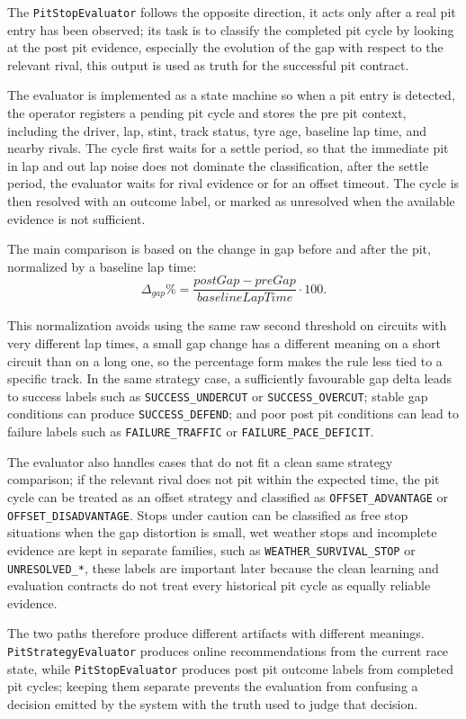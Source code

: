 The \texttt{PitStopEvaluator} follows the opposite direction, it acts only after a real pit entry has been observed; its task is to classify the completed pit cycle by looking
at the post pit evidence, especially the evolution of the gap with respect to the relevant rival, this output is used as truth for the successful pit contract.

The evaluator is implemented as a state machine so when a pit entry is detected, the operator registers a pending pit cycle and stores the pre pit context, including the driver,
lap, stint, track status, tyre age, baseline lap time, and nearby rivals. The cycle first waits for a settle period, so that the immediate pit in lap and out lap noise does not
dominate the classification, after the settle period, the evaluator waits for rival evidence or for an offset timeout. The cycle is then resolved with an outcome label, or marked
as unresolved when the available evidence is not sufficient.

The main comparison is based on the change in gap before and after the pit, normalized by a baseline lap time:
\[
    \Delta_{gap}\% =
    \frac{postGap - preGap}{baselineLapTime} \cdot 100.
\]

This normalization avoids using the same raw second threshold on circuits with very different lap times, a small gap change has a different meaning on a short circuit than on a
long one, so the percentage form makes the rule less tied to a specific track. In the same strategy case, a sufficiently favourable gap delta leads to success labels such as
\texttt{SUCCESS\_UNDERCUT} or \texttt{SUCCESS\_OVERCUT}; stable gap conditions can produce \texttt{SUCCESS\_DEFEND}; and poor post pit conditions can lead to failure labels such as
\texttt{FAILURE\_TRAFFIC} or \texttt{FAILURE\_PACE\_DEFICIT}.

The evaluator also handles cases that do not fit a clean same strategy comparison; if the relevant rival does not pit within the expected time, the pit cycle can be treated as
an offset strategy and classified as \texttt{OFFSET\_ADVANTAGE} or \texttt{OFFSET\_DISADVANTAGE}. Stops under caution can be classified as free stop situations when the gap
distortion is small, wet weather stops and incomplete evidence are kept in separate families, such as \texttt{WEATHER\_SURVIVAL\_STOP} or \texttt{UNRESOLVED\_*}, these labels are
important later because the clean learning and evaluation contracts do not treat every historical pit cycle as equally reliable evidence.

The two paths therefore produce different artifacts with different meanings.\\ \texttt{PitStrategyEvaluator} produces online recommendations from the current race state, while
\texttt{PitStopEvaluator} produces post pit outcome labels from completed pit cycles; keeping them separate prevents the evaluation from confusing a decision emitted by the
system with the truth used to judge that decision.

